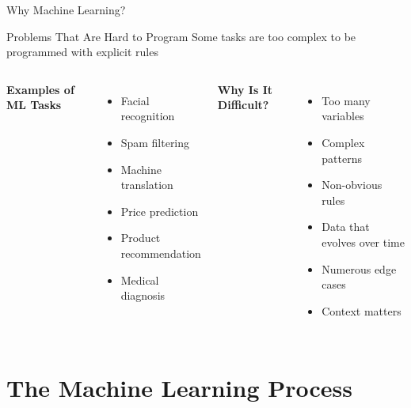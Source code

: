 \documentclass[12pt,aspectratio=169]{beamer}
\begin{document}
\begin{frame}{Why Machine Learning?}
\begin{block}{Problems That Are Hard to Program}
Some tasks are too complex to be programmed with explicit rules
\end{block}

\vspace{0.3cm}

\begin{columns}[T]
\textbf{Examples of ML Tasks}
\begin{itemize}
\item Facial recognition
\item Spam filtering
\item Machine translation
\item Price prediction
\item Product recommendation
\item Medical diagnosis
\end{itemize}

\textbf{Why Is It Difficult?}
\begin{itemize}
\item Too many variables
\item Complex patterns
\item Non-obvious rules
\item Data that evolves over time
\item Numerous edge cases
\item Context matters
\end{itemize}
\end{columns}
\end{frame}

\section{The Machine Learning Process}
\end{document}
